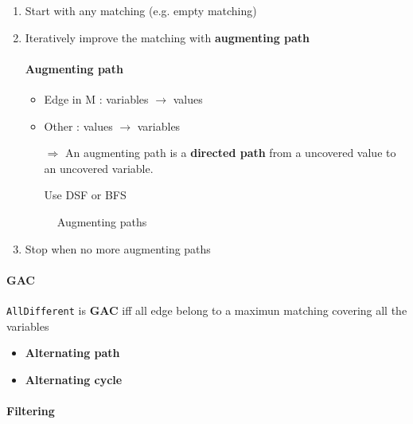 \begin{enumerate}
    \item Start with any matching (e.g. empty matching)
    \item Iteratively improve the matching with \textbf{augmenting path}

        \paragraph{Augmenting path}
        \begin{itemize}
            \item Edge in M : variables $\to$ values
            \item Other : values $\to$ variables

            \item[$\Rightarrow$] An augmenting path is a \textbf{directed path}
                from a uncovered value to an uncovered variable.

                Use DSF or BFS
        \end{itemize}

        \begin{figure}[!h]
            \centering
            \caption{Augmenting paths}
        \end{figure}

    \item Stop when no more augmenting paths
\end{enumerate}

\paragraph{GAC}

\begin{description}
    \item \texttt{AllDifferent} is \textbf{GAC} iff all edge belong to
        a maximun matching covering all the variables
\end{description}

\begin{itemize}
    \item \textbf{Alternating path}

    \item \textbf{Alternating cycle}

\end{itemize}

\paragraph{Filtering}

